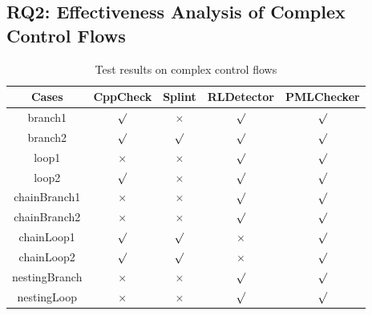 \subsection{RQ2: Effectiveness Analysis of Complex Control Flows}

\begin{table}[!h]
\center
\caption{Test results on complex control flows}\label{tab:7}
\begin{tabular}{|c|c|c|c|c|}
\hline
\textbf{Cases}  & \textbf{CppCheck} & \textbf{Splint} & \textbf{RLDetector} & \textbf{PMLChecker}\\
\hline
branch1	 &$\surd$ & $\times$ & $\surd$ & $\surd$\\
\hline
branch2    & $\surd$ & $\surd$ & $\surd$ & $\surd$\\
\hline
loop1	 &$\times$ &	$\times$ & $\surd$ & $\surd$\\
\hline
loop2    & $\surd$ &$\times$ & $\surd$ & $\surd$\\
\hline
chainBranch1 & $\times$ & $\times$ & $\surd$ & $\surd$\\
\hline
chainBranch2 &	$\times$	& $\times$ & $\surd$ & $\surd$\\
\hline
chainLoop1	 & $\surd$ & $\surd$ & $\times$ & $\surd$\\
\hline
chainLoop2	 & $\surd$& $\surd$ & $\times$ & $\surd$\\
\hline
nestingBranch	 & $\times$ & $\times$ & $\surd$ & $\surd$\\
\hline
nestingLoop& $\times$ & $\times$ & $\surd$ & $\surd$\\
\hline
\end{tabular}
\end{table}



